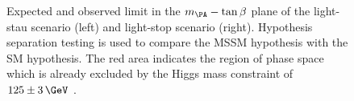 \begin{figure}[tbh]
\caption[Expected and observed limit in the $m_{\PA}-\tan\beta$ plane of the
light-stau scenario (left) and light-stop scenario (right).]
{Expected and observed limit in the $m_{\PA}-\tan\beta$ plane of the
light-stau scenario (left) and light-stop scenario (right). Hypothesis
separation testing is used to compare the \ac{MSSM} hypothesis with the SM
hypothesis. The red area indicates the region of phase space which is already
excluded by the Higgs mass constraint of $125\pm3\,\GeV$ \cite{HIG-13-021}.}
\label{fig:lightstaulightstop}
\end{figure}

